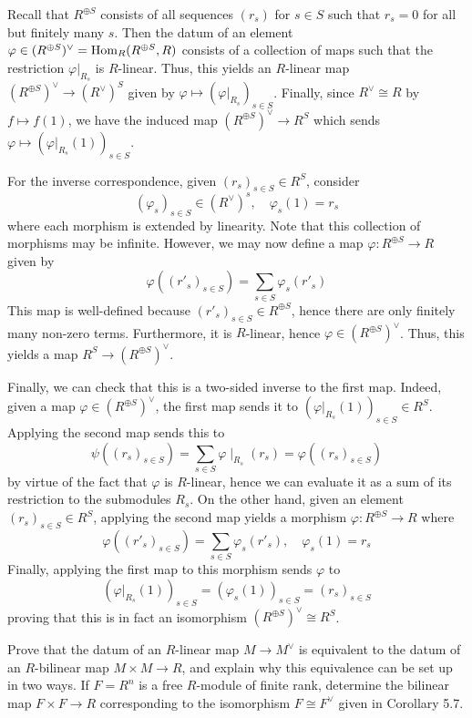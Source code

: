\documentclass[../../master.tex]{subfiles}
\begin{document}
\begin{solution}
    Recall that $R^{\oplus S}$ consists of all sequences $(r_s)$ for $s \in S$ such that $r_s = 0$ for all but finitely many $s$.
    Then the datum of an element $\varphi \in (R^{\oplus S})^{\vee} = \operatorname{Hom}_R(R^{\oplus S}, R)$ consists of a collection of maps such that the restriction $\varphi |_{R_s}$ is $R$-linear.
    Thus, this yields an $R$-linear map $(R^{\oplus S})^{\vee} \to (R^{\vee})^{S}$ given by $\varphi \mapsto (\varphi |_{R_s})_{s \in S}$.
    Finally, since $R^{\vee} \cong R$ by $f \mapsto f(1)$, we have the induced map $(R^{\oplus S})^{\vee} \to R^{S}$ which sends $\varphi \mapsto (\varphi|_{R_{s}}(1))_{s \in S}$.

    For the inverse correspondence, given $(r_s)_{s \in S} \in R^{S}$, consider
    \[
        (\varphi_s)_{s \in S} \in (R^{\vee})^{s}, \quad \varphi_s(1) = r_s
    \]
    where each morphism is extended by linearity.
    Note that this collection of morphisms may be infinite.
    However, we may now define a map $\varphi : R^{\oplus S} \to R$ given by
    \[
        \varphi((r'_s)_{s \in S}) = \sum_{s \in S} \varphi_s(r'_s)
    \]
    This map is well-defined because $(r'_s)_{s \in S} \in R^{\oplus S}$, hence there are only finitely many non-zero terms.
    Furthermore, it is $R$-linear, hence $\varphi \in (R^{\oplus S})^{\vee}$.
    Thus, this yields a map $R^{S} \to (R^{\oplus S})^{\vee}$.

    Finally, we can check that this is a two-sided inverse to the first map.
    Indeed, given a map $\varphi \in (R^{\oplus S})^{\vee}$, the first map sends it to $(\varphi|_{R_s}(1))_{s \in S} \in R^{S}$.
    Applying the second map sends this to
    \[
        \psi((r_s)_{s \in S}) = \sum_{s \in S} \varphi \mid_{R_s}(r_s) = \varphi((r_s)_{s \in S})
    \]
    by virtue of the fact that $\varphi$ is $R$-linear, hence we can evaluate it as a sum of its restriction to the submodules $R_s$.
    On the other hand, given an element $(r_s)_{s \in S} \in R^{S}$, applying the second map yields a morphism $\varphi : R^{\oplus S} \to R$ where
    \[
        \varphi((r'_s)_{s \in S}) = \sum_{s \in S} \varphi_s(r'_s), \quad \varphi_s(1) = r_s
    \]
    Finally, applying the first map to this morphism sends $\varphi$ to
    \[
        (\varphi|_{R_s}(1))_{s \in S} = (\varphi_s(1))_{s \in S} = (r_s)_{s \in S}
    \]
    proving that this is in fact an isomorphism $(R^{\oplus S})^{\vee} \cong R^{S}$.
\end{solution}

\begin{problem}
    Prove that the datum of an $R$-linear map $M \to M^{\vee}$ is equivalent to the datum of an $R$-bilinear map $M \times M \to R$, and explain why this equivalence can be set up in two ways.
    If $F = R^{n}$ is a free $R$-module of finite rank, determine the bilinear map $F \times F \to R$ corresponding to the isomorphism $F \cong F^{\vee}$ given in Corollary 5.7.
\end{problem}
\end{document}
